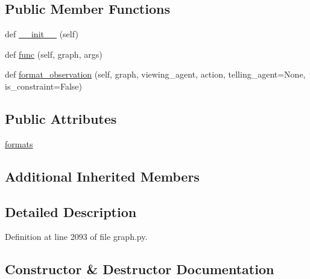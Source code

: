\subsection*{Public Member Functions}
\begin{DoxyCompactItemize}
\item 
def \hyperlink{classlight__chats_1_1graph_1_1LookFunction_a2b2692f97a52251a450c60d10a80f37e}{\+\_\+\+\_\+init\+\_\+\+\_\+} (self)
\item 
def \hyperlink{classlight__chats_1_1graph_1_1LookFunction_aeaedd1fa680a930dc86a1120d9daf63d}{func} (self, graph, args)
\item 
def \hyperlink{classlight__chats_1_1graph_1_1LookFunction_a7723e1da8ce79443c49fd4a5f6dce978}{format\+\_\+observation} (self, graph, viewing\+\_\+agent, action, telling\+\_\+agent=None, is\+\_\+constraint=False)
\end{DoxyCompactItemize}
\subsection*{Public Attributes}
\begin{DoxyCompactItemize}
\item 
\hyperlink{classlight__chats_1_1graph_1_1LookFunction_a98ca1312bcaf009a34ee3e1b1b43a3d6}{formats}
\end{DoxyCompactItemize}
\subsection*{Additional Inherited Members}


\subsection{Detailed Description}


Definition at line 2093 of file graph.\+py.



\subsection{Constructor \& Destructor Documentation}
\mbox{\label{classlight__chats_1_1graph_1_1LookFunction_a2b2692f97a52251a450c60d10a80f37e}} 
